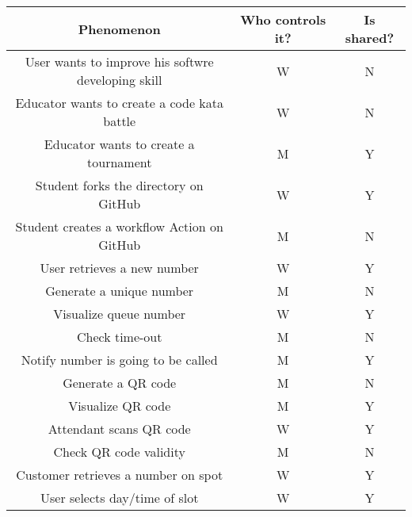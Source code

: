 \documentclass{article}
\begin{document}
\begin{center}
    \begin{table}
        \begin{tabularx}{\textwidth}{| c| c| c|}
            \hline
            \rowcolor{blue!50}
            Phenomenon                                 & Who controls it? & Is shared? \\
            \hline
            User wants to improve his softwre developing skill                    & W                & N          \\
            Educator wants to create a code kata battle                        & W                & N          \\
            Educator wants to create a tournament                        & M                & Y          \\
            Student forks the directory on GitHub                                 & W                & Y          \\
            Student creates a workflow Action on GitHub               & M                & N          \\
            User retrieves a new number                & W                & Y          \\
            Generate a unique number                   & M                & N          \\
            Visualize queue number                     & W                & Y          \\
            Check time-out                             & M                & N          \\
            Notify number is going to be called        & M                & Y          \\
            Generate a QR code                         & M                & N          \\
            Visualize QR code                          & M                & Y          \\
            Attendant scans QR code                    & W                & Y          \\
            Check QR code validity                     & M                & N          \\
            Customer retrieves a number on spot        & W                & Y          \\
            User selects day/time of slot              & W                & Y          \\

\end{tabularx}
\end{table}
\end{center}
\end{document}
